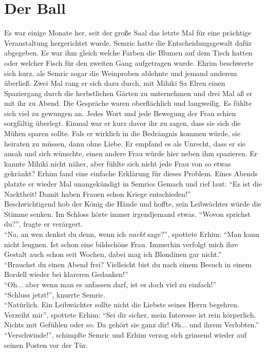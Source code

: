 \chapter{Der Ball}

Es war einige Monate her, seit der große Saal das letzte Mal für eine prächtige Veranstaltung 
hergerichtet wurde. Semric hatte die Entscheidungsgewalt dafür abgegeben. Es war ihm gleich welche 
Farben die Blumen auf dem Tisch hatten oder welcher Fisch für den zweiten Gang aufgetragen wurde. 
Ehrim beschwerte sich kurz, als Semric sogar die Weinproben ablehnte und jemand anderem überließ. 
Zwei Mal rang er sich dazu durch, mit Mihiki Sa Elren einen Spaziergang durch die herbstlichen 
Gärten zu unternehmen und drei Mal aß er mit ihr zu Abend. Die Gespräche waren oberflächlich und 
langweilig. Es fühlte sich viel zu gewungen an. Jedes Wort und jede Bewegung der Frau schien 
sorgfältig überlegt. Einmal war er kurz davor ihr zu sagen, dass sie sich die Mühen sparen sollte. 
Fals er wirklich in die Bedrängnis kommen würde, sie heiraten zu müssen, dann ohne Liebe. Er 
empfand es als Unrecht, dass er sie ansah und sich wünschte, einen andere Frau würde hier neben ihm 
spazieren. Er kannte Mihiki nicht näher, aber fühlte sich nicht jede Frau von so etwas gekränkt? 
Erhim fand eine einfache Erklärung für dieses Problem. Eines Abends platzte er wieder Mal 
unangekündigt in Semrics Gemach und rief laut: ``Es ist die Nacktheit! Damit haben Frauen schon 
Kriege entschieden!''\\
Beschwichtigend hob der König die Hände und hoffte, sein Leibwächter würde die Stimme senken. Im 
Schloss hörte immer irgendjemand etwas. ``Wovon sprichst du?'', fragte er verärgert.\\
``Na, an wen denkst du denn, wenn ich \textit{nackt} sage?'', spottete Erhim: ``Man kann nicht 
leugnen. Ist schon eine bildschöne Frau. Immerhin verfolgt mich ihre Gestalt auch schon seit 
Wochen, dabei mag ich Blondinen gar nicht.''\\
``Brauchst du einen Abend frei? Vielleicht bist du nach einem Besuch in einem Bordell wieder bei 
klareren Gedanken!''\\
``Oh... aber wenn man es anfassen darf, ist es doch viel zu einfach!''\\
``Schluss jetzt!'', knurrte Semric.\\
``Natürlich. Ein Leibwächter sollte nicht die Liebste seines Herrn begehren. Verzeiht mir'', 
spottete Erhim: ``Sei dir sicher, mein Interesse ist rein körperlich. Nichts mit Gefühlen oder so. 
Da gehört sie ganz dir! Oh... und ihrem Verlobten.''\\
``Verschwinde!'', schimpfte Semric und Erhim verzog sich grinsend wieder auf seinen Posten vor der 
Tür.\\

